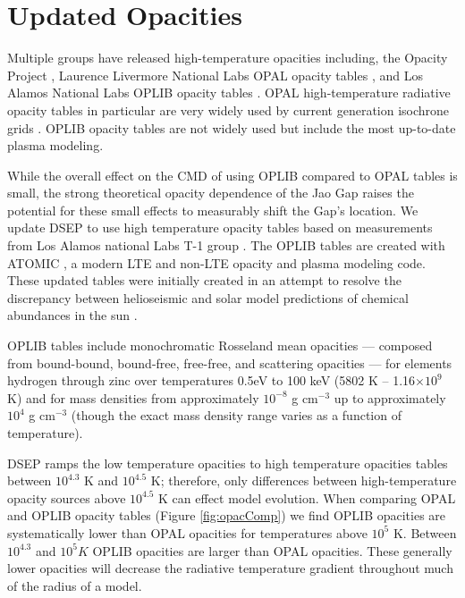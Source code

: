 \section{Updated Opacities}\label{sec:opac}
Multiple groups have released high-temperature opacities including, the Opacity
Project \citep[OP][]{Seaton1994}, Laurence Livermore National Labs OPAL opacity
tables \citep{Iglesias1996}, and Los Alamos National Labs OPLIB opacity tables
\citep{Colgan2016}. OPAL high-temperature radiative opacity tables in
particular are very widely used by current generation isochrone grids
\citep[e.g. Dartmouth, MIST, \& StarEvol, ][]{Dotter2008,Choi2016,Amard2019}.
OPLIB opacity tables \citep{Colgan2016} are not widely used but include the
most up-to-date plasma modeling.

While the overall effect on the CMD of using OPLIB compared to OPAL tables is
small, the strong theoretical opacity dependence of the Jao Gap raises the
potential for these small effects to measurably shift the Gap's location. We
update DSEP to use high temperature opacity tables based on measurements from
Los Alamos national Labs T-1 group \citep[OPLIB,][]{Colgan2016}. The OPLIB
tables are created with ATOMIC \citep{Magee2004,Hakel2006,Fontes2016}, a modern
LTE and non-LTE opacity and plasma modeling code. These updated tables were
initially created in an attempt to resolve the discrepancy between helioseismic
and solar model predictions of chemical abundances in the sun
\citep{Bahcall2005}. 

OPLIB tables include monochromatic Rosseland mean opacities --- composed from
bound-bound, bound-free, free-free, and scattering opacities --- for elements
hydrogen through zinc over temperatures 0.5eV to 100 keV (5802 K -- 1.16$\times
10 ^{9}$ K) and for mass densities from approximately $10^{-8}$ g cm$^{-3}$ up
to approximately $10^{4}$ g cm$^{-3}$ (though the exact mass density range
varies as a function of temperature). 

DSEP ramps the \citet{Ferguson2005} low temperature opacities to high
temperature opacities tables between $10^{4.3}$ K and $10^{4.5}$ K; therefore,
only differences between high-temperature opacity sources above $10^{4.5}$ K
can effect model evolution. When comparing OPAL and OPLIB opacity tables
(Figure \ref{fig:opacComp}) we find OPLIB opacities are systematically lower
than OPAL opacities for temperatures above $10^{5}$ K. Between $10^{4.3}$ and
$10^{5} K$ OPLIB opacities are larger than OPAL opacities. These generally
lower opacities will decrease the radiative temperature gradient throughout
much of the radius of a model.

